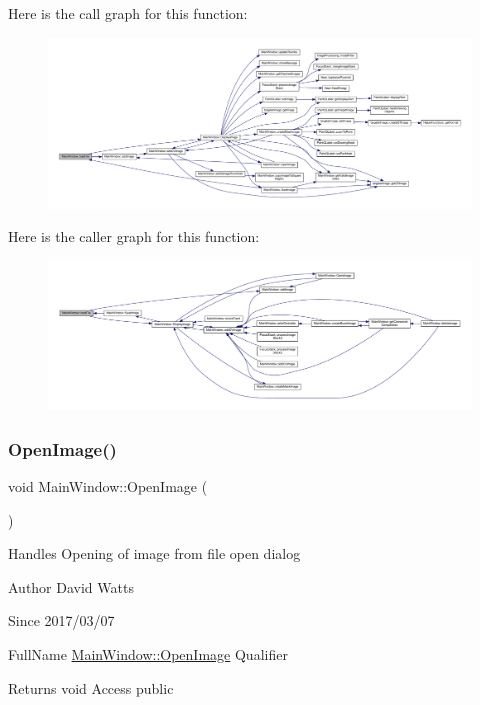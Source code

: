 Here is the call graph for this function\+:
\nopagebreak
\begin{figure}[H]
\begin{center}
\leavevmode
\includegraphics[width=350pt]{class_main_window_aa08469ed5c8396e60fa44bae6530bcf1_cgraph}
\end{center}
\end{figure}
Here is the caller graph for this function\+:
\nopagebreak
\begin{figure}[H]
\begin{center}
\leavevmode
\includegraphics[width=350pt]{class_main_window_aa08469ed5c8396e60fa44bae6530bcf1_icgraph}
\end{center}
\end{figure}
\mbox{\label{class_main_window_acea9cebdcf70bf45107baa0789e732bf}} 
\subsubsection{\texorpdfstring{Open\+Image()}{OpenImage()}}
{\footnotesize\ttfamily void Main\+Window\+::\+Open\+Image (\begin{DoxyParamCaption}{ }\end{DoxyParamCaption})}

Handles Opening of image from file open dialog

\begin{DoxyAuthor}{Author}
David Watts 
\end{DoxyAuthor}
\begin{DoxySince}{Since}
2017/03/07
\end{DoxySince}
Full\+Name \hyperlink{class_main_window_acea9cebdcf70bf45107baa0789e732bf}{Main\+Window\+::\+Open\+Image} Qualifier \begin{DoxyReturn}{Returns}
void Access public 
\end{DoxyReturn}


